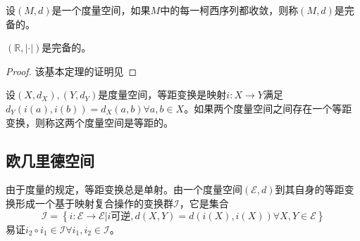 \documentclass[main.tex]{subfiles}
\begin{document}
\begin{definition}[度量空间的完备性]
设$\left(M,d\right)$是一个度量空间，如果$M$中的每一柯西序列都收敛，则称$\left(M,d\right)$是完备的。
\end{definition}

\begin{theorem}
$\left(\mathbb{R},\left|\cdot\right|\right)$是完备的。
\end{theorem}
\begin{proof}
该基本定理的证明见
\end{proof}

\begin{definition}[等距变换]
设$\left(X,d_X\right),\left(Y,d_Y\right)$是度量空间，等距变换是映射$i:X\rightarrow Y$满足$d_Y\left(i\left(a\right),i\left(b\right)\right)=d_X\left(a,b\right)\forall a,b\in X$。如果两个度量空间之间存在一个等距变换，则称这两个度量空间是等距的。
\end{definition}

\subsection{欧几里德空间}
由于度量的规定，等距变换总是单射。由一个度量空间$\left(\mathcal{E},d\right)$到其自身的等距变换形成一个基于映射复合操作的变换群$\mathcal{I}$，它是集合
\[\mathcal{I}=\left\{i:\mathcal{E}\rightarrow\mathcal{E}|i\text{可逆},d\left(X,Y\right)=d\left(i\left(X\right),i\left(X\right)\right)\forall X,Y\in\mathcal{E}\right\}\]
易证$i_2\circ i_1\in\mathcal{I}\forall i_1,i_2\in\mathcal{I}$。
\end{document}
